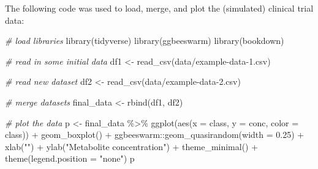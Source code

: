 \documentclass[smallextended]{svjour3}       %
\newenvironment{Shaded}{\begin{snugshade}}{\end{snugshade}}
\newcommand{\AttributeTok}[1]{\textcolor[rgb]{0.77,0.63,0.00}{#1}}
\newcommand{\CommentTok}[1]{\textcolor[rgb]{0.56,0.35,0.01}{\textit{#1}}}
\newcommand{\FloatTok}[1]{\textcolor[rgb]{0.00,0.00,0.81}{#1}}
\newcommand{\FunctionTok}[1]{\textcolor[rgb]{0.00,0.00,0.00}{#1}}
\newcommand{\NormalTok}[1]{#1}
\newcommand{\OtherTok}[1]{\textcolor[rgb]{0.56,0.35,0.01}{#1}}
\newcommand{\SpecialCharTok}[1]{\textcolor[rgb]{0.00,0.00,0.00}{#1}}
\newcommand{\StringTok}[1]{\textcolor[rgb]{0.31,0.60,0.02}{#1}}
\begin{document}
The following code was used to load, merge, and plot the (simulated) clinical trial data:

\begin{Shaded}
\begin{Highlighting}[]
\CommentTok{\# load libraries}
\FunctionTok{library}\NormalTok{(tidyverse)}
\FunctionTok{library}\NormalTok{(ggbeeswarm)}
\FunctionTok{library}\NormalTok{(bookdown)}
\end{Highlighting}
\end{Shaded}

\begin{Shaded}
\begin{Highlighting}[]
\CommentTok{\# read in some initial data}
\NormalTok{df1 }\OtherTok{\textless{}{-}} \FunctionTok{read\_csv}\NormalTok{(}\StringTok{\textquotesingle{}data/example{-}data{-}1.csv\textquotesingle{}}\NormalTok{)}
\end{Highlighting}
\end{Shaded}

\begin{Shaded}
\begin{Highlighting}[]
\CommentTok{\# read new dataset}
\NormalTok{df2 }\OtherTok{\textless{}{-}} \FunctionTok{read\_csv}\NormalTok{(}\StringTok{\textquotesingle{}data/example{-}data{-}2.csv\textquotesingle{}}\NormalTok{)}
\end{Highlighting}
\end{Shaded}

\begin{Shaded}
\begin{Highlighting}[]
\CommentTok{\# merge datasets}
\NormalTok{final\_data }\OtherTok{\textless{}{-}} \FunctionTok{rbind}\NormalTok{(df1, df2)}
\end{Highlighting}
\end{Shaded}

\begin{Shaded}
\begin{Highlighting}[]
\CommentTok{\# plot the data}
\NormalTok{p }\OtherTok{\textless{}{-}}\NormalTok{ final\_data }\SpecialCharTok{\%\textgreater{}\%} 
  \FunctionTok{ggplot}\NormalTok{(}\FunctionTok{aes}\NormalTok{(}\AttributeTok{x =}\NormalTok{ class, }\AttributeTok{y =}\NormalTok{ conc, }\AttributeTok{color =}\NormalTok{ class)) }\SpecialCharTok{+}
  \FunctionTok{geom\_boxplot}\NormalTok{() }\SpecialCharTok{+}
\NormalTok{  ggbeeswarm}\SpecialCharTok{::}\FunctionTok{geom\_quasirandom}\NormalTok{(}\AttributeTok{width =} \FloatTok{0.25}\NormalTok{) }\SpecialCharTok{+} 
  \FunctionTok{xlab}\NormalTok{(}\StringTok{""}\NormalTok{) }\SpecialCharTok{+}
  \FunctionTok{ylab}\NormalTok{(}\StringTok{"Metabolite concentration"}\NormalTok{) }\SpecialCharTok{+} 
  \FunctionTok{theme\_minimal}\NormalTok{() }\SpecialCharTok{+}
  \FunctionTok{theme}\NormalTok{(}\AttributeTok{legend.position =} \StringTok{"none"}\NormalTok{)}
\NormalTok{p}
\end{Highlighting}
\end{Shaded}
\end{document}
